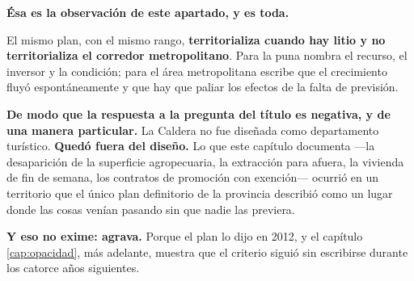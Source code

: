 \begin{cautela}
\textbf{Ésa es la observación de este apartado, y es toda.}

El mismo plan, con el mismo rango, \textbf{territorializa cuando hay litio y no territorializa
el corredor metropolitano}. Para la puna nombra el recurso, el inversor y la condición; para el
área metropolitana escribe que el crecimiento fluyó espontáneamente y que hay que paliar los
efectos de la falta de previsión.

\textbf{De modo que la respuesta a la pregunta del título es negativa, y de una manera
particular.} La Caldera no fue diseñada como departamento turístico. \textbf{Quedó fuera del
diseño.} Lo que este capítulo documenta ---la desaparición de la superficie agropecuaria, la
extracción para afuera, la vivienda de fin de semana, los contratos de promoción con exención---
ocurrió en un territorio que el único plan definitorio de la provincia describió como un lugar
donde las cosas venían pasando sin que nadie las previera.

\textbf{Y eso no exime: agrava.} Porque el plan lo dijo en 2012, y el capítulo
\ref{cap:opacidad}, más adelante, muestra que el criterio siguió sin escribirse durante los catorce años
siguientes.
\end{cautela}

